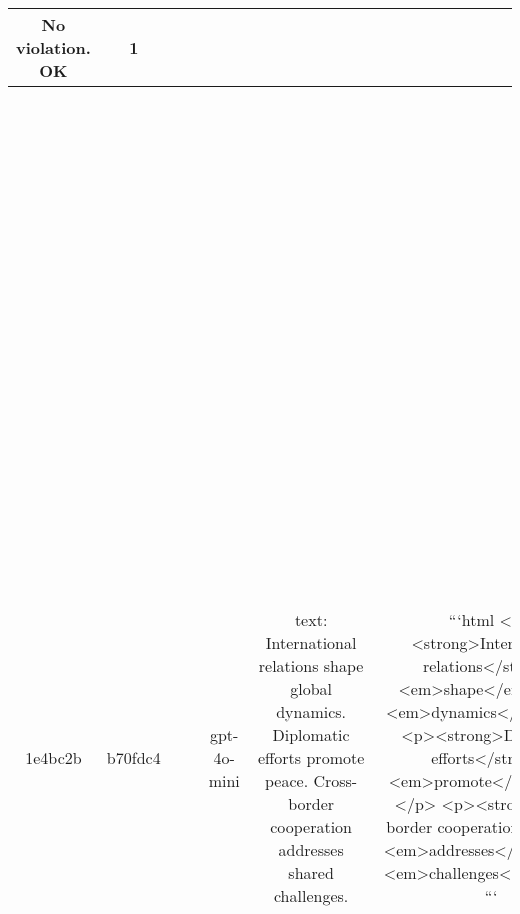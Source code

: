 \begin{table}[h!]
\begin{tabular}{|c|c|c|c|c|c|c|c|c|c|}
No violation.
OK & 1\\
\hline
1e4bc2b & b70fdc4 &  &  & gpt-4o-mini & text: International relations shape global dynamics. Diplomatic efforts promote peace. Cross-border cooperation addresses shared challenges. & ```html
<p><strong>International relations</strong> <em>shape</em> global <em>dynamics</em>.</p>
<p><strong>Diplomatic efforts</strong> <em>promote</em> peace.</p>
<p><strong>Cross-border cooperation</strong> <em>addresses</em> shared <em>challenges</em>.</p>
``` & ok & The chatbot output includes three paragraphs, each enclosed in a `<p>` tag, which satisfies the requirement for having at least three `<p>` tags. Within each `<p>` tag, there is a `<strong>` tag wrapped around a key phrase, fulfilling the requirement to include one `<strong>` tag per sentence. Additionally, there are multiple `<em>` tags in each paragraph to emphasize key words or phrases. This output complies with the description provided, as it includes the necessary HTML tags and formatting for the given text. Thus, there is no violation of the rules specified in the description.

No violation.
OK & 1\\
\hline
9becc42 & b70fdc4 &  &  & gpt-4o-mini & text: Graphic design combines aesthetics and communication. It plays a role in branding and identity. Versatility is key in a digital landscape. & ```html
<p><strong>Graphic design</strong> combines <em>aesthetics</em> and <em>communication</em>.</p>
<p>It plays a role in <strong>branding</strong> and <em>identity</em>.</p>
<p><strong>Versatility</strong> is key in a <em>digital</em> landscape.</p>
``` & ok & The provided output includes three separate sentences, each enclosed within its own `<p>` tag, which adheres to the requirement of having at least three `<p>` tags. Within each `<p>` tag, there is a `<strong>` tag used to emphasize a key word in the sentence, which is in accordance with the instruction to use a `<strong>` tag for emphasis. Additionally, multiple `<em>` tags are employed in the sentences to emphasize certain words or phrases, thus satisfying the requirement for using `<em>` tags.

The output does not reveal any non-compliance with the description. The criteria of wrapping individual sentences with `<p>` tags and incorporating at least one `<strong>` tag and multiple `<em>` tags within each `<p>` tag have all been explicitly fulfilled.


\end{tabular}
\end{table}
